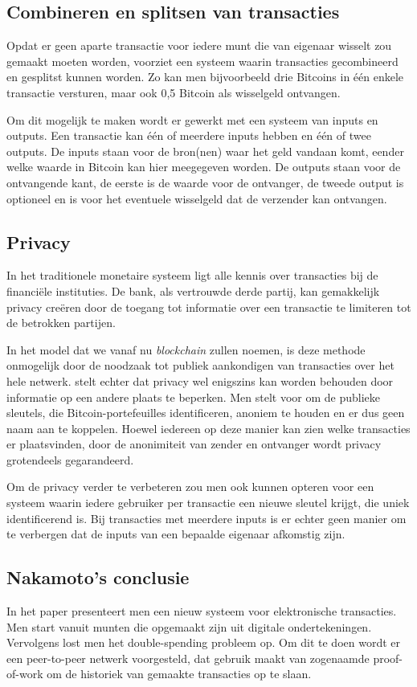 	\subsection{Combineren en splitsen van transacties}
	Opdat er geen aparte transactie voor iedere munt die van eigenaar wisselt zou gemaakt moeten worden, voorziet \textcite{Nakamoto2008} een systeem waarin transacties gecombineerd en gesplitst kunnen worden. Zo kan men bijvoorbeeld drie Bitcoins in één enkele transactie versturen, maar ook 0,5 Bitcoin als wisselgeld ontvangen.
	
	Om dit mogelijk te maken wordt er gewerkt met een systeem van inputs en outputs. Een transactie kan één of meerdere inputs hebben en één of twee outputs. De inputs staan voor de bron(nen) waar het geld vandaan komt, eender welke waarde in Bitcoin kan hier meegegeven worden. De outputs staan voor de ontvangende kant, de eerste is de waarde voor de ontvanger, de tweede output is optioneel en is voor het eventuele wisselgeld dat de verzender kan ontvangen.
	\subsection{Privacy}
	In het traditionele monetaire systeem ligt alle kennis over transacties bij de financiële instituties. De bank, als vertrouwde derde partij, kan gemakkelijk privacy creëren door de toegang tot informatie over een transactie te limiteren tot de betrokken partijen. 
	
	In het model dat we vanaf nu \textit{blockchain} zullen noemen, is deze methode onmogelijk door de noodzaak tot publiek aankondigen van transacties over het hele netwerk.  \textcite{Nakamoto2008} stelt echter dat privacy wel enigszins kan worden behouden door informatie op een andere plaats te beperken. Men stelt voor om de publieke sleutels, die Bitcoin-portefeuilles identificeren, anoniem te houden en er dus geen naam aan te koppelen. Hoewel iedereen op deze manier kan zien welke transacties er plaatsvinden, door de anonimiteit van zender en ontvanger wordt privacy grotendeels gegarandeerd.
	
	Om de privacy verder te verbeteren zou men ook kunnen opteren voor een systeem waarin iedere gebruiker per transactie een nieuwe sleutel krijgt, die uniek identificerend is. Bij transacties met meerdere inputs is er echter geen manier om te verbergen dat de inputs van een bepaalde eigenaar afkomstig zijn.
	\subsection{Nakamoto’s conclusie}
	In het paper presenteert men een nieuw systeem voor elektronische transacties. Men start vanuit munten die opgemaakt zijn uit digitale ondertekeningen. Vervolgens lost men het double-spending probleem op. Om dit te doen wordt er een peer-to-peer netwerk voorgesteld, dat gebruik maakt van zogenaamde proof-of-work om de historiek van gemaakte transacties op te slaan. 
	
